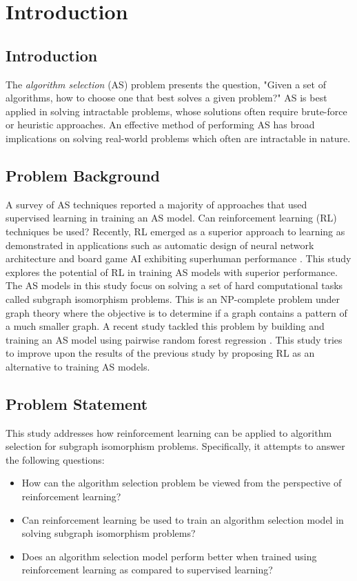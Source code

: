 \chapter{Introduction}
\section{Introduction}
The \textit{algorithm selection} (AS) problem presents the question, "Given a set of algorithms, how to choose one that best solves a given problem?" AS is best applied in solving intractable problems, whose solutions often require brute-force or heuristic approaches. An effective method of performing AS has broad implications on solving real-world problems which often are intractable in nature.

\section{Problem Background}
A survey of AS techniques \citep{kotthoff2016algorithm} reported a majority of approaches that used supervised learning in training an AS model. Can reinforcement learning (RL) techniques be used? Recently, RL emerged as a superior approach to learning as demonstrated in applications such as automatic design of neural network architecture \citep{zoph2016neural} and board game AI exhibiting superhuman performance \citep{silver2016mastering}. This study explores the potential of RL in training AS models with superior performance. The AS models in this study focus on solving a set of hard computational tasks called subgraph isomorphism problems. This is an NP-complete problem under graph theory where the objective is to determine if a graph contains a pattern of a much smaller graph. A recent study tackled this problem by building and training an AS model using pairwise random forest regression \citep{kotthoff2016portfolios}. This study tries to improve upon the results of the previous study by proposing RL as an alternative to training AS models.

\section{Problem Statement}
This study addresses how reinforcement learning can be applied to algorithm selection for subgraph isomorphism problems. Specifically, it attempts to answer the following questions:
\begin{itemize}
	\item How can the algorithm selection problem be viewed from the perspective of reinforcement learning?
	\item Can reinforcement learning be used to train an algorithm selection model in solving subgraph isomorphism problems?
	\item Does an algorithm selection model perform better when trained using reinforcement learning as compared to supervised learning?
\end{itemize}

